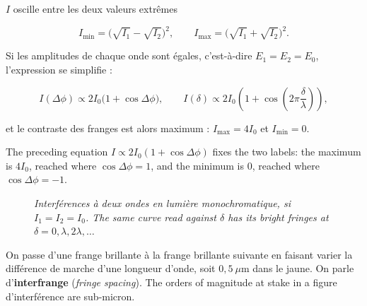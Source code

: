 $I$ oscille entre les deux valeurs extrêmes

\[ I_{\min} = \bigl(\sqrt{I_1} - \sqrt{I_2}\bigr)^{2}, \qquad
   I_{\max} = \bigl(\sqrt{I_1} + \sqrt{I_2}\bigr)^{2}. \]

Si les amplitudes de chaque onde sont égales, c'est-à-dire $E_1 = E_2 = E_0$,
l'expression se simplifie :

\[ I(\Delta\phi) \propto 2 I_0 \bigl(1 + \cos\Delta\phi\bigr), \qquad
   I(\delta) \propto 2 I_0 \left(1 + \cos\left(2\pi\frac{\delta}{\lambda}\right)\right), \]

et le contraste des franges est alors maximum :
$I_{\max} = 4 I_0$ et $I_{\min} = 0$.

\begin{remark}
  The preceding equation $I \propto 2I_0(1+\cos\Delta\phi)$ fixes the two
  labels: the maximum is $4I_0$, reached where $\cos\Delta\phi = 1$, and the
  minimum is $0$, reached where $\cos\Delta\phi = -1$.
\end{remark}

\begin{figure}[h!]
  \centering

  \smallskip
  {\small\itshape Interférences à deux ondes en lumière monochromatique, si
  $I_1 = I_2 = I_0$. The same curve read against $\delta$ has its bright fringes
  at $\delta = 0, \lambda, 2\lambda, \dots$}
\end{figure}

\begin{definition}[Interfrange]
  On passe d'une frange brillante à la frange brillante suivante en faisant
  varier la différence de marche d'une longueur d'onde, soit $0{,}5\ \mu$m dans
  le jaune. On parle d'\textbf{interfrange} (\textit{fringe spacing}). The orders
  of magnitude at stake in a figure d'interférence are sub-micron.
\end{definition}

